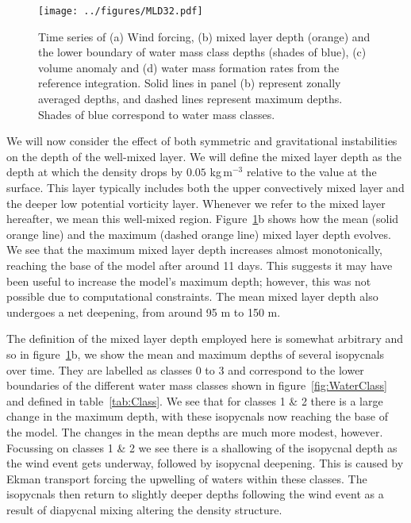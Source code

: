 \begin{figure}[p]
    \centering
    \texttt{[image: ../figures/MLD32.pdf]}
    \caption{Time series of (a) Wind forcing, (b) mixed layer depth (orange) and the lower boundary of water mass class depths (shades of blue), (c) volume anomaly and (d) water mass formation rates from the reference integration. Solid lines in panel (b) represent zonally averaged depths, and dashed lines represent maximum depths. Shades of blue correspond to water mass classes.}
    \label{fig:EnsStandardMLD}
\end{figure}

We will now consider the effect of both symmetric and gravitational instabilities on the depth of the well-mixed layer. We will define the mixed layer depth as the depth at which the density drops by $0.05$ kg\,m$^{-3}$ relative to the value at the surface. This layer typically includes both the upper convectively mixed layer and the deeper low potential vorticity layer. Whenever we refer to the mixed layer hereafter, we mean this well-mixed region. Figure~\ref{fig:EnsStandardMLD}b shows how the mean (solid orange line) and the maximum (dashed orange line) mixed layer depth evolves. We see that the maximum mixed layer depth increases almost monotonically, reaching the base of the model after around 11 days. This suggests it may have been useful to increase the model's maximum depth; however, this was not possible due to computational constraints. The mean mixed layer depth also undergoes a net deepening, from around 95 m to 150 m.

The definition of the mixed layer depth employed here is somewhat arbitrary and so in figure~\ref{fig:EnsStandardMLD}b, we show the mean and maximum depths of several isopycnals over time. They are labelled as classes 0 to 3 and correspond to the lower boundaries of the different water mass classes shown in figure~\ref{fig:WaterClass} and defined in table~\ref{tab:Class}. We see that for classes 1 \& 2 there is a large change in the maximum depth, with these isopycnals now reaching the base of the model. The changes in the mean depths are much more modest, however. Focussing on classes 1 \& 2 we see there is a shallowing of the isopycnal depth as the wind event gets underway, followed by isopycnal deepening. This is caused by Ekman transport forcing the upwelling of waters within these classes. The isopycnals then return to slightly deeper depths following the wind event as a result of diapycnal mixing altering the density structure.

